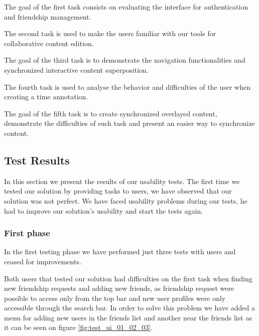       The goal of the first task consists on evaluating the interface for authentication and friendship management.

      The second task is used to make the users familiar with our tools for collaborative content edition.

      The goal of the third task is to demonstrate the navigation functionalities and synchronized interactive content superposition.

      The fourth task is used to analyse the behavior and difficulties of the user when creating a time annotation.

      The goal of the fifth task is to create synchronized overlayed content, demonstrate the difficulties of such task and present an easier way to synchronize content.

  \subsection{Test Results}

In this section we present the results of our usability tests. The first time we tested our solution by providing tasks to users, we have observed that our solution was not perfect. We have faced usability problems during our tests, he had to improve our solution's usability and start the tests again.

  \subsubsection {First phase}

In the first testing phase we have performed just three tests with users and ceased for improvements. 

Both users that tested our solution had difficulties on the first task when finding new friendship requests and adding new friends, as friendship request were possible to access only from the top bar and new user profiles were only accessible through the search bar. In order to solve this problem we have added a menu for adding new users in the friends list and another near the friends list as it can be seen on figure \ref{fig:test_ui_01_02_03}.

